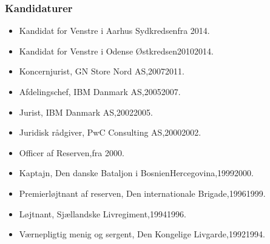 \documentclass[11pt, a4paper]{awesome-cv}
\begin{document}
\begin{cvletter}
\subsubsection*{Kandidaturer}
\begin{itemize}
\item Kandidat for Venstre i Aarhus Sydkredsenfra 2014.
\item Kandidat for Venstre i Odense Østkredsen20102014.
\end{itemize}
\begin{itemize}
\item Koncernjurist, GN Store Nord AS,20072011.
\item Afdelingschef, IBM Danmark AS,20052007.
\item Jurist, IBM Danmark AS,20022005.
\item Juridisk rådgiver, PwC Consulting AS,20002002.
\item Officer af Reserven,fra 2000.
\item Kaptajn, Den danske Bataljon i BosnienHercegovina,19992000.
\item Premierløjtnant af reserven, Den internationale Brigade,19961999.
\item Løjtnant, Sjællandske Livregiment,19941996.
\item Værnepligtig menig og sergent, Den Kongelige Livgarde,19921994.
\end{itemize}
\end{cvletter}
\end{document}
